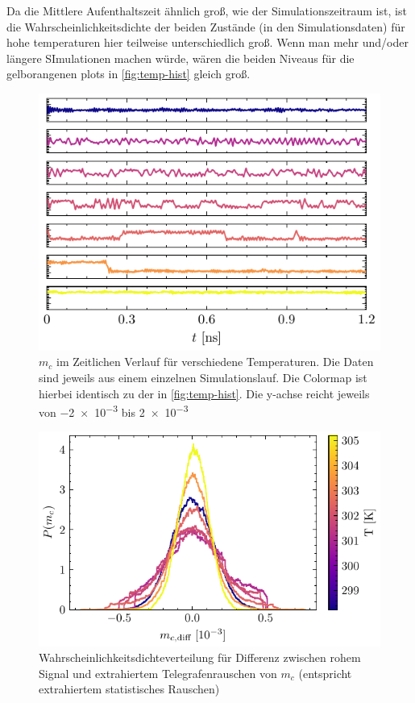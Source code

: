 \documentclass[main.tex]{subfiles}
\begin{document}
Da die Mittlere Aufenthaltszeit ähnlich groß, wie der Simulationszeitraum ist, ist die Wahrscheinlichkeitsdichte der beiden Zustände (in den Simulationsdaten) für hohe temperaturen hier teilweise unterschiedlich groß. Wenn man mehr und/oder längere SImulationen machen würde, wären die beiden Niveaus für die gelborangenen plots in \cref{fig:temp-hist} gleich groß.

\begin{figure}[H]
    \centering
    \includegraphics{bilder/plots/temp_comparison_long/mc_time.pdf}
    \caption{\(m_c\) im Zeitlichen Verlauf für verschiedene Temperaturen. Die Daten sind jeweils aus einem einzelnen Simulationslauf. Die Colormap ist hierbei identisch zu der in \cref{fig:temp-hist}. Die y-achse reicht jeweils von \num{-2e-3} bis \num{+2e-3}}\label{fig:temp-time}
\end{figure}

\begin{figure}[H]
    \centering
    \includegraphics{bilder/plots/temp_comparison_long/mc_diff_hist.pdf}
    \caption{Wahrscheinlichkeitsdichteverteilung für Differenz zwischen rohem Signal und extrahiertem Telegrafenrauschen von \(m_c\) (entspricht extrahiertem statistisches Rauschen)}\label{fig:temp-diff-hist}    
\end{figure}
\end{document}
